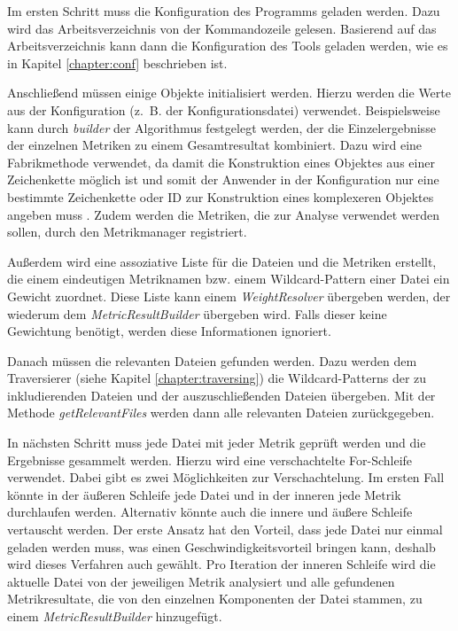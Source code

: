 Im ersten Schritt  muss die Konfiguration des Programms geladen werden. Dazu wird das Arbeitsverzeichnis von der Kommandozeile gelesen. Basierend auf das Arbeitsverzeichnis kann dann die Konfiguration des Tools geladen werden, wie es in Kapitel \ref{chapter:conf} beschrieben ist.  

Anschließend müssen einige Objekte  initialisiert werden. Hierzu werden die Werte aus der Konfiguration (z.~B. der Konfigurationsdatei) verwendet. Beispielsweise kann durch \textit{builder} der Algorithmus festgelegt werden, der die Einzelergebnisse der einzelnen Metriken zu einem Gesamtresultat kombiniert. Dazu wird eine Fabrikmethode verwendet, da damit die Konstruktion eines Objektes aus einer Zeichenkette möglich ist und somit der Anwender in der Konfiguration nur eine bestimmte Zeichenkette oder ID zur Konstruktion eines komplexeren Objektes angeben muss \cite[S.~149--161]{gamma2015design}. Zudem werden die Metriken, die zur Analyse verwendet werden sollen, durch den Metrikmanager registriert.

Außerdem wird eine assoziative Liste für die Dateien und die Metriken erstellt, die einem eindeutigen Metriknamen bzw. einem Wildcard-Pattern einer Datei ein Gewicht zuordnet. Diese Liste kann einem \textit{WeightResolver} übergeben werden, der wiederum dem  \textit{MetricResultBuilder} übergeben wird. Falls dieser keine Gewichtung benötigt, werden diese Informationen ignoriert. 

Danach müssen die relevanten Dateien gefunden werden. Dazu werden dem Traversierer (siehe Kapitel \ref{chapter:traversing}) die Wildcard-Patterns der zu inkludierenden Dateien und der auszuschließenden Dateien übergeben. Mit der Methode \textit{getRelevantFiles} werden dann alle relevanten Dateien zurückgegeben.

In nächsten Schritt muss jede Datei mit jeder Metrik geprüft werden und die Ergebnisse gesammelt werden. Hierzu wird eine verschachtelte For-Schleife verwendet. Dabei gibt es zwei Möglichkeiten zur Verschachtelung. Im ersten Fall könnte in der äußeren Schleife jede Datei und in der inneren jede Metrik durchlaufen werden. Alternativ könnte auch die innere und äußere Schleife vertauscht werden. Der erste Ansatz hat den Vorteil, dass jede Datei nur einmal geladen werden muss, was einen Geschwindigkeitsvorteil bringen kann, deshalb wird dieses Verfahren auch gewählt. Pro Iteration der inneren Schleife wird die aktuelle Datei von der jeweiligen Metrik analysiert und alle gefundenen Metrikresultate, die von den einzelnen Komponenten der Datei stammen, zu einem \textit{MetricResultBuilder} hinzugefügt.

